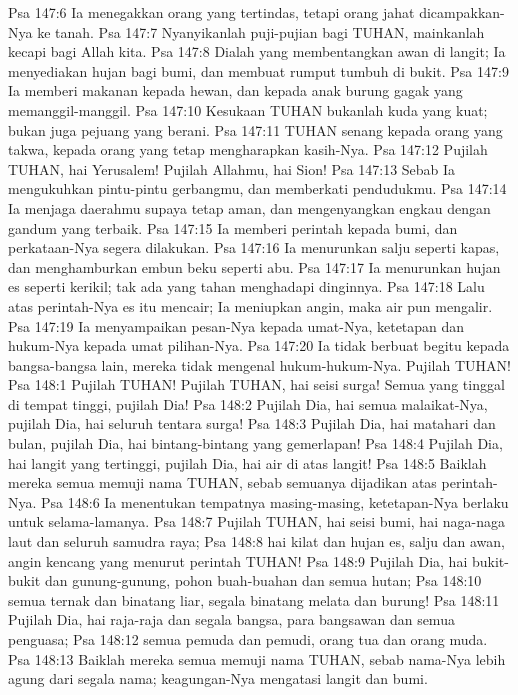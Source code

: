 Psa 147:6  Ia menegakkan orang yang tertindas, tetapi orang jahat dicampakkan-Nya ke tanah.
Psa 147:7  Nyanyikanlah puji-pujian bagi TUHAN, mainkanlah kecapi bagi Allah kita.
Psa 147:8  Dialah yang membentangkan awan di langit; Ia menyediakan hujan bagi bumi, dan membuat rumput tumbuh di bukit.
Psa 147:9  Ia memberi makanan kepada hewan, dan kepada anak burung gagak yang memanggil-manggil.
Psa 147:10  Kesukaan TUHAN bukanlah kuda yang kuat; bukan juga pejuang yang berani.
Psa 147:11  TUHAN senang kepada orang yang takwa, kepada orang yang tetap mengharapkan kasih-Nya.
Psa 147:12  Pujilah TUHAN, hai Yerusalem! Pujilah Allahmu, hai Sion!
Psa 147:13  Sebab Ia mengukuhkan pintu-pintu gerbangmu, dan memberkati pendudukmu.
Psa 147:14  Ia menjaga daerahmu supaya tetap aman, dan mengenyangkan engkau dengan gandum yang terbaik.
Psa 147:15  Ia memberi perintah kepada bumi, dan perkataan-Nya segera dilakukan.
Psa 147:16  Ia menurunkan salju seperti kapas, dan menghamburkan embun beku seperti abu.
Psa 147:17  Ia menurunkan hujan es seperti kerikil; tak ada yang tahan menghadapi dinginnya.
Psa 147:18  Lalu atas perintah-Nya es itu mencair; Ia meniupkan angin, maka air pun mengalir.
Psa 147:19  Ia menyampaikan pesan-Nya kepada umat-Nya, ketetapan dan hukum-Nya kepada umat pilihan-Nya.
Psa 147:20  Ia tidak berbuat begitu kepada bangsa-bangsa lain, mereka tidak mengenal hukum-hukum-Nya. Pujilah TUHAN!
Psa 148:1  Pujilah TUHAN! Pujilah TUHAN, hai seisi surga! Semua yang tinggal di tempat tinggi, pujilah Dia!
Psa 148:2  Pujilah Dia, hai semua malaikat-Nya, pujilah Dia, hai seluruh tentara surga!
Psa 148:3  Pujilah Dia, hai matahari dan bulan, pujilah Dia, hai bintang-bintang yang gemerlapan!
Psa 148:4  Pujilah Dia, hai langit yang tertinggi, pujilah Dia, hai air di atas langit!
Psa 148:5  Baiklah mereka semua memuji nama TUHAN, sebab semuanya dijadikan atas perintah-Nya.
Psa 148:6  Ia menentukan tempatnya masing-masing, ketetapan-Nya berlaku untuk selama-lamanya.
Psa 148:7  Pujilah TUHAN, hai seisi bumi, hai naga-naga laut dan seluruh samudra raya;
Psa 148:8  hai kilat dan hujan es, salju dan awan, angin kencang yang menurut perintah TUHAN!
Psa 148:9  Pujilah Dia, hai bukit-bukit dan gunung-gunung, pohon buah-buahan dan semua hutan;
Psa 148:10  semua ternak dan binatang liar, segala binatang melata dan burung!
Psa 148:11  Pujilah Dia, hai raja-raja dan segala bangsa, para bangsawan dan semua penguasa;
Psa 148:12  semua pemuda dan pemudi, orang tua dan orang muda.
Psa 148:13  Baiklah mereka semua memuji nama TUHAN, sebab nama-Nya lebih agung dari segala nama; keagungan-Nya mengatasi langit dan bumi.
